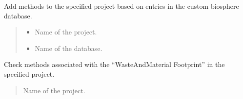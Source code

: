 \documentclass[letterpaper,10pt,english]{sphinxmanual}
\begin{document}
\begin{fulllineitems}
\label{\detokenize{WasteAndMaterialFootprint:WasteAndMaterialFootprint.MethodEditor.AddMethods}}
\pysigstartsignatures
{}
\pysigstopsignatures
\sphinxAtStartPar
Add methods to the specified project based on entries in the custom biosphere database.
\begin{quote}\begin{description}
\begin{itemize}
\item {} 
\sphinxAtStartPar
{} \textendash{} Name of the project.

\item {} 
\sphinxAtStartPar
{} \textendash{} Name of the database.

\end{itemize}

\end{description}\end{quote}

\end{fulllineitems}


\begin{fulllineitems}
\label{\detokenize{WasteAndMaterialFootprint:WasteAndMaterialFootprint.MethodEditor.CheckMethods}}
\pysigstartsignatures
{}
\pysigstopsignatures
\sphinxAtStartPar
Check methods associated with the “WasteAndMaterial Footprint” in the specified project.
\begin{quote}\begin{description}
\sphinxAtStartPar
{} \textendash{} Name of the project.

\end{description}\end{quote}

\end{fulllineitems}
\end{document}
